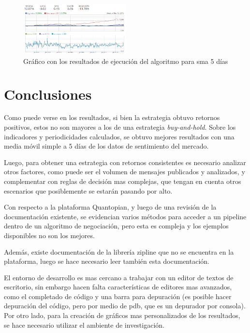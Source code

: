 \documentclass[a4paper, 11pt, twocolumn]{article}
\begin{document}
\begin{figure}[ht]
\centering
\includegraphics[width=0.5\textwidth]{graph.png}
\caption{\label{fig:sol_iter}Gráfico con los resultados de ejecución del algoritmo para sma 5 días}
\end{figure}

\section{Conclusiones}
Como puede verse en los resultados, si bien la estrategia obtuvo retornos positivos, estos no son mayores a los de una estrategia \textit{buy-and-hold}. Sobre los indicadores y periodicidades calculados, se obtuvo mejores resultados con una media móvil simple a 5 días de los datos de sentimiento del mercado.

Luego, para obtener una estrategia con retornos consistentes es necesario analizar otros factores, como puede ser el volumen de mensajes publicados y analizados, y complementar con reglas de decisión mas complejas, que tengan en cuenta otros escenarios que posiblemente se estarán pasando por alto.

Con respecto a la plataforma Quantopian, y luego de una revisión de la documentación existente, se evidencian varios métodos para acceder a un pipeline dentro de un algoritmo de negociación, pero esta es compleja y los ejemplos disponibles no son los mejores.

Además, existe documentación de la librería zipline que no se encuentra en la plataforma, luego se hace necesario leer también esta documentación.

El entorno de desarrollo es mas cercano a trabajar con un editor de textos de escritorio, sin embargo hacen falta características de editores mas avanzados, como el completado de código y una barra para depuración (es posible hacer depuración del código, pero por medio de pdb, que es un depurador por consola). Por otro lado, para la creación de gráficos mas personalizados de los resultados, se hace necesario utilizar el ambiente de investigación.
\end{document}

